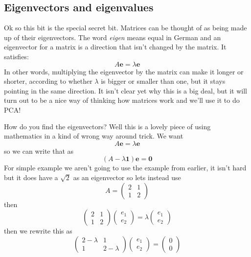 \documentclass[12pt]{article}
\begin{document}
\subsection*{Eigenvectors and eigenvalues}

Ok so this bit is the special secret bit. Matrices can be thought of
as being made up of their eigenvectors. The word \textsl{eigen} means
equal in German and an eigenvector for a matrix is a direction that isn't changed by the matrix. It satisfies:
\begin{equation}
  A\textbf{e}=\lambda \textbf{e}
\end{equation}
In other words, multiplying the eigenvector by the matrix can make it
longer or shorter, according to whether $\lambda$ is bigger or smaller
than one, but it stays pointing in the same direction. It isn't clear
yet why this is a big deal, but it will turn out to be a nice way of
thinking how matrices work and we'll use it to do PCA!

How do you find the eigenvectors? Well this is a lovely piece of using
mathematics in a kind of wrong way around trick. We want
\begin{equation}
  A\textbf{e}=\lambda \textbf{e}
\end{equation}
so we can write that as
\begin{equation}
  \left(A-\lambda \textbf{1}\right)\mathbf{e}=\mathbf{0}
\end{equation}
For simple example we aren't going to use the example from earlier, it isn't hard but it does have a $\sqrt{2}$ as an eigenvector so lets instead use
\begin{equation}
  A=
\begin{pmatrix}
2 & 1 \\
1 & 2
\end{pmatrix}
\end{equation}
then
\begin{equation}
  \begin{pmatrix}
2 & 1 \\
1 & 2
\end{pmatrix}\begin{pmatrix}
e_1 \\ e_2
\end{pmatrix}
=\lambda
\begin{pmatrix}
e_1 \\ e_2
\end{pmatrix}
\end{equation}
then we rewrite this as
\begin{equation}
  \begin{pmatrix}
2-\lambda & 1 \\
1 & 2-\lambda
\end{pmatrix}\begin{pmatrix}
e_1 \\ e_2
\end{pmatrix}
=
\begin{pmatrix}
0 \\ 0
\end{pmatrix}
\end{equation}
\end{document}
